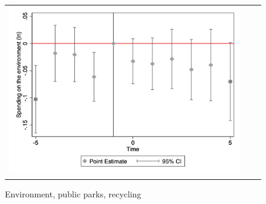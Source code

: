 \begin{figure}[!ht]
\begin{tabular}{@{}ccc@{}}
\begin{minipage}[t]{0.32\textwidth}
            \centering
            \caption{Environment, public parks, recycling}
            \includegraphics[width=\linewidth]{images/total population/eventdd_ln_q4_09_step1.jpg}
            \label{fig:environment}
        \end{minipage}
    \end{tabular}
\end{figure}
